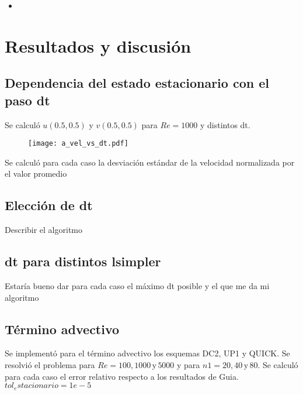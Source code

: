 \documentclass[aps,prb,twocolumn,superscriptaddress,floatfix,longbibliography,10pt]{revtex4-2}
\newcounter{para}
\begin{document}
\begin{itemize}
  \item 
\end{itemize}

\section{Resultados y discusión}


\subsection{Dependencia del estado estacionario con el paso dt}

Se calculó $u(0.5,0.5)$ y $v(0.5,0.5)$ para $Re = 1000$ y distintos dt.

\begin{figure}[h]
  \texttt{[image: a\_vel\_vs\_dt.pdf]}
  \caption{}
   \label{fig:a_vel_vs_dt}
\end{figure}

Se calculó para cada caso la desviación estándar de la velocidad normalizada por el valor promedio

\subsection{Elección de dt}
Describir el algoritmo

\subsection{dt para distintos lsimpler}

Estaría bueno dar para cada caso el máximo dt posible y el que me da mi algoritmo

\subsection{Término advectivo}

Se implementó para el término advectivo los esquemas DC2, UP1 y QUICK. Se resolvió el problema para $Re = 100, 1000 \, \mathrm{y} \, 5000$ y para $n1 = 20, 40 \, \mathrm{y} \, 80$. Se calculó para cada caso el error relativo respecto a los resultados de Guia.
$tol_estacionario = 1e-5$
\end{document}
